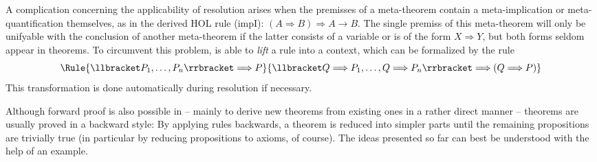 A complication concerning the applicability of resolution arises when the
premisses of a meta-theorem contain a meta-implication or meta-quantification
themselves, as in the derived HOL rule (impI): $(A \Longrightarrow B) \Longrightarrow A \longrightarrow B$. The single
premiss of this meta-theorem will only be unifyable with the conclusion of
another meta-theorem if the latter consists of a variable or is of the form
$X\Longrightarrow Y$, but both forms seldom appear in theorems.  To circumvent this problem,
\Isabelle is able to \emph{lift} a rule into a context, which can be formalized
by the rule
\begin{equation}
  \Rule{\llbracket P_1,\ldots,P_n\rrbracket \Longrightarrow P}
       {\llbracket Q \Longrightarrow P_1,\ldots,Q\Longrightarrow P_n\rrbracket \Longrightarrow (Q \Longrightarrow P)}
\end{equation}
This transformation is done automatically during resolution if necessary. 

Although forward proof is also possible in \Isabelle -- mainly to derive new
theorems from existing ones in a rather direct manner -- theorems are usually
proved in a backward style: By applying rules backwards, a theorem is reduced
into simpler parts until the remaining propositions are trivially true (in
particular by reducing propositions to axioms, of course).  The ideas presented
so far can best be understood with the help of an example. 

